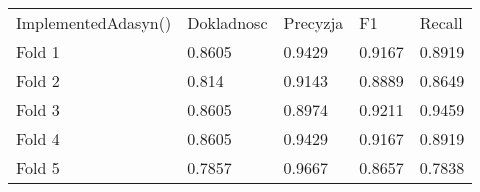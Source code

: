 \begin{tabular}{lllll}
\hline
 ImplementedAdasyn() & Dokladnosc & Precyzja & F1     & Recall \\
 Fold 1              & 0.8605     & 0.9429   & 0.9167 & 0.8919 \\
 Fold 2              & 0.814      & 0.9143   & 0.8889 & 0.8649 \\
 Fold 3              & 0.8605     & 0.8974   & 0.9211 & 0.9459 \\
 Fold 4              & 0.8605     & 0.9429   & 0.9167 & 0.8919 \\
 Fold 5              & 0.7857     & 0.9667   & 0.8657 & 0.7838 \\
\hline
\end{tabular}